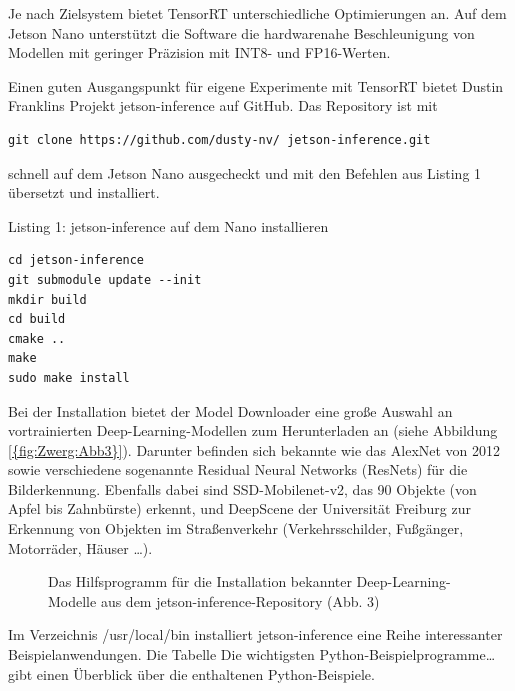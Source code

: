 Je nach Zielsystem bietet TensorRT unterschiedliche Optimierungen an. Auf dem Jetson Nano unterstützt die Software die hardwarenahe Beschleunigung von Modellen mit geringer Präzision mit INT8- und FP16-Werten. 

Einen guten Ausgangspunkt für eigene Experimente mit TensorRT bietet Dustin Franklins Projekt jetson-inference auf GitHub. Das Repository ist mit 

\begin{lstlisting}
git clone https://github.com/dusty-nv/ jetson-inference.git
\end{lstlisting}

schnell auf dem Jetson Nano ausgecheckt und mit den Befehlen aus Listing 1 übersetzt und installiert. 



Listing 1: jetson-inference auf dem Nano installieren 
\begin{lstlisting}
cd jetson-inference
git submodule update --init
mkdir build
cd build
cmake ..
make
sudo make install
\end{lstlisting}

Bei der Installation bietet der Model Downloader eine große Auswahl an vortrainierten Deep-Learning-Modellen zum Herunterladen an (siehe Abbildung \ref{{fig:Zwerg:Abb3}}). Darunter befinden sich bekannte wie das AlexNet von 2012 sowie verschiedene sogenannte Residual Neural Networks (ResNets) für die Bilderkennung. Ebenfalls dabei sind SSD-Mobilenet-v2, das 90 Objekte (von Apfel bis Zahnbürste) erkennt, und DeepScene der Universität Freiburg zur Erkennung von Objekten im Straßenverkehr (Verkehrsschilder, Fußgänger, Motorräder, Häuser …). 

\begin{figure}
	
	\caption[Installation bekannter Deep-Learning-Modelle]{Das Hilfsprogramm für die Installation bekannter Deep-Learning-Modelle aus dem jetson-inference-Repository (Abb. 3)}\label{fig:Zwerg:Abb3}
\end{figure}


Im Verzeichnis /usr/local/bin installiert jetson-inference eine Reihe interessanter Beispielanwendungen. Die Tabelle \glqq Die wichtigsten Python-Beispielprogramme\ldots\grqq{} gibt einen Überblick über die enthaltenen Python-Beispiele. 


